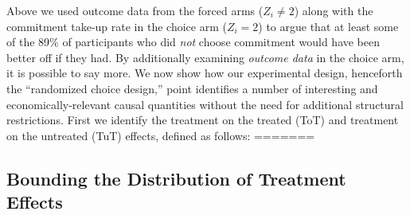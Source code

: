 \documentclass[oneside,11pt]{article}
\begin{document}
Above we used outcome data from the forced arms ($Z_i\neq 2$) along with the commitment take-up rate in the choice arm ($Z_i = 2$) to argue that at least some of the 89\% of participants who did \emph{not} choose commitment would have been better off if they had. 
By additionally examining \emph{outcome data} in the choice arm, it is possible to say more. 
We now show how our experimental design, henceforth the ``randomized choice design,'' point identifies a number of interesting and economically-relevant causal quantities without the need for additional structural restrictions.
First we identify the treatment on the treated (ToT) and treatment on the untreated (TuT) effects, defined as follows:
=======
\vspace{.2in}
\subsection{Bounding the Distribution of Treatment Effects}
\vspace{.1in}
\end{document}
